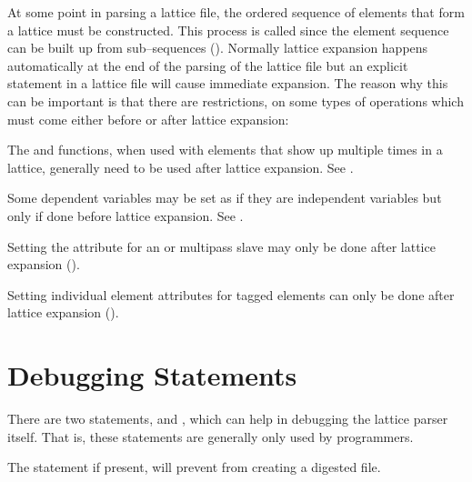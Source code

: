 At some point in parsing a lattice file, the ordered sequence of
elements that form a lattice must be constructed. This process is called
 since the element sequence can be built up from
sub--sequences (). Normally lattice expansion happens
automatically at the end of the parsing of the lattice file but an
explicit  statement in a lattice file will cause
immediate expansion. The reason why this can be important is that there
are restrictions, on some types of operations which must come either
before or after lattice expansion:
\begin{Itemize}
\item 
{}
The  and  functions, when used with elements
that show up multiple times in a lattice, generally need to be used
after lattice expansion. See .
\item 
Some dependent variables may be set as if they are independent
variables but only if done before lattice expansion. See .
\item 
Setting the  attribute for an 
 or  multipass
slave may only be done after lattice expansion ().
\item
{}
Setting individual element attributes for tagged elements can only be done
after lattice expansion ().
\end{Itemize}

\section{Debugging Statements}

There are two statements,  and ,
which can help in debugging the \bmad lattice parser
itself.  That is, these statements are generally only used by programmers.

The  statement if present, will prevent \bmad from 
creating a digested file. 

